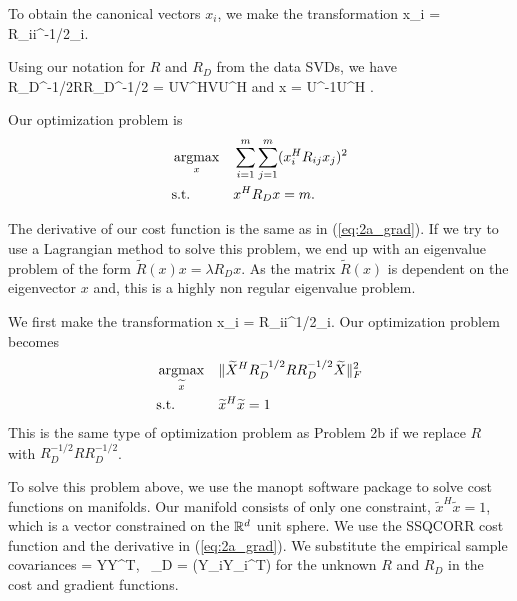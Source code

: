 To obtain the canonical vectors $x_i$, we make the transformation
\be
x_i = R_{ii}^{-1/2}_i.
\ee

Using our notation for $R$ and $R_D$ from the data SVDs, we have
\be
R_D^{-1/2}RR_D^{-1/2} = UV^HVU^H
\ee
and
\be
x = U\Sigma^{-1}U^H .
\ee



Our optimization problem is
\begin{equation*}
\begin{aligned}
&\mathop{\rm argmax}_{x}&&\sum_{i=1}^m\sum_{j=1}^m(x_i^HR_{ij}x_j)^2\\
&\text{s.t.} &&x^HR_Dx  = m.\\
\end{aligned}
\end{equation*}

The derivative of our cost function is the same as in (\ref{eq:2a_grad}). If we try to use
a Lagrangian method to solve this problem, we end up with an eigenvalue problem of the
form $\widetilde{R}(x)x = \lambda R_D x$. As the matrix $\widetilde{R}(x)$ is dependent on
the eigenvector $x$ and, this is a highly non regular eigenvalue problem. 


We first make the transformation 
\be
x_i = R_{ii}^{1/2}_i. 
\ee
Our optimization problem becomes
\begin{equation*}
\begin{aligned}
&\mathop{\rm argmax}_{\widetilde{x}}&&\|\widetilde{X}^HR_D^{-1/2}RR_D^{-1/2}\widetilde{X}\|_F^2\\
&\text{s.t.} &&\widetilde{x}^H\widetilde{x} = 1\\
\end{aligned}
\end{equation*}
This is the same type of optimization problem as Problem 2b if we replace $R$ with
$R_D^{-1/2}RR_D^{-1/2}$.

To solve this problem above, we use the manopt software package to solve cost functions on
manifolds. Our manifold consists of only one constraint, $\widetilde{x}^H\widetilde{x} =
1$, which is a vector constrained on the $\mathbb{R}^d$ unit sphere. We use the SSQCORR cost function
and the derivative in (\ref{eq:2a_grad}). We substitute the empirical sample covariances 
\be
{} = YY^T,\,\,\, _D = \blkdiag(Y_iY_i^T)
\ee
 for the unknown $R$ and $R_D$ in the cost and gradient functions.

